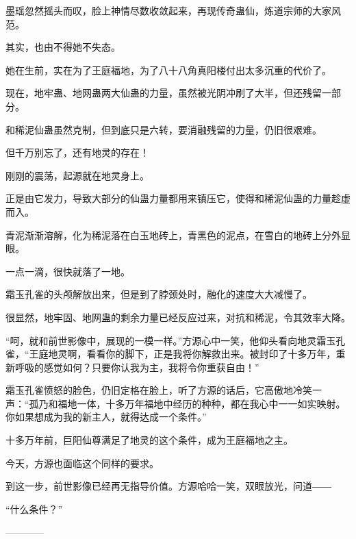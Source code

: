 \begin{this_body}
墨瑶忽然摇头而叹，脸上神情尽数收敛起来，再现传奇蛊仙，炼道宗师的大家风范。

其实，也由不得她不失态。

她在生前，实在为了王庭福地，为了八十八角真阳楼付出太多沉重的代价了。

现在，地牢蛊、地网蛊两大仙蛊的力量，虽然被光阴冲刷了大半，但还残留一部分。

和稀泥仙蛊虽然克制，但到底只是六转，要消融残留的力量，仍旧很艰难。

但千万别忘了，还有地灵的存在！

刚刚的震荡，起源就在地灵身上。

正是由它发力，导致大部分的仙蛊力量都用来镇压它，使得和稀泥仙蛊的力量趁虚而入。

青泥渐渐溶解，化为稀泥落在白玉地砖上，青黑色的泥点，在雪白的地砖上分外显眼。

一点一滴，很快就落了一地。

霜玉孔雀的头颅解放出来，但是到了脖颈处时，融化的速度大大减慢了。

很显然，地牢固、地网蛊的剩余力量已经反应过来，对抗和稀泥，令其效率大降。

“呵，就和前世影像中，展现的一模一样。”方源心中一笑，他仰头看向地灵霜玉孔雀，“王庭地灵啊，看看你的脚下，正是我将你解救出来。被封印了十多万年，重新呼吸的感觉如何？只要你认我为主，我将令你重获自由！”

霜玉孔雀愤怒的脸色，仍旧定格在脸上，听了方源的话后，它高傲地冷笑一声：“孤乃和福地一体，十多万年福地中经历的种种，都在我心中一一如实映射。你如果想成为我的新主人，就得达成一个条件。”

十多万年前，巨阳仙尊满足了地灵的这个条件，成为王庭福地之主。

今天，方源也面临这个同样的要求。

到这一步，前世影像已经再无指导价值。方源哈哈一笑，双眼放光，问道――

“什么条件？”

------------

\end{this_body}

